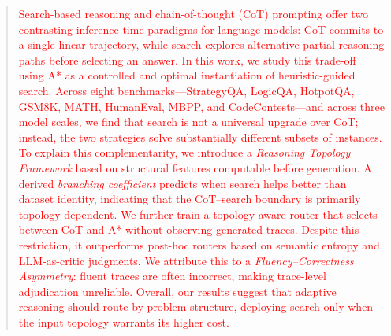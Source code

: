 \documentclass[11pt]{article}
\begin{document}



\begin{abstract}
\textcolor{red}{Search-based reasoning and chain-of-thought (CoT) prompting offer two contrasting inference-time paradigms for language models: CoT commits to a single linear trajectory, while search explores alternative partial reasoning paths before selecting an answer. In this work, we study this trade-off using A* as a controlled and optimal instantiation of heuristic-guided search. Across eight benchmarks---StrategyQA, LogicQA, HotpotQA, GSM8K, MATH, HumanEval, MBPP, and CodeContests---and across three model scales, we find that search is not a universal upgrade over CoT; instead, the two strategies solve substantially different subsets of instances. To explain this complementarity, we introduce a \emph{Reasoning Topology Framework} based on structural features computable before generation. A derived \emph{branching coefficient} predicts when search helps better than dataset identity, indicating that the CoT--search boundary is primarily topology-dependent. We further train a topology-aware router that selects between CoT and A* without observing generated traces. Despite this restriction, it outperforms post-hoc routers based on semantic entropy and LLM-as-critic judgments. We attribute this to a \emph{Fluency--Correctness Asymmetry}: fluent traces are often incorrect, making trace-level adjudication unreliable. Overall, our results suggest that adaptive reasoning should route by problem structure, deploying search only when the input topology warrants its higher cost.}
\end{abstract}
\end{document}
